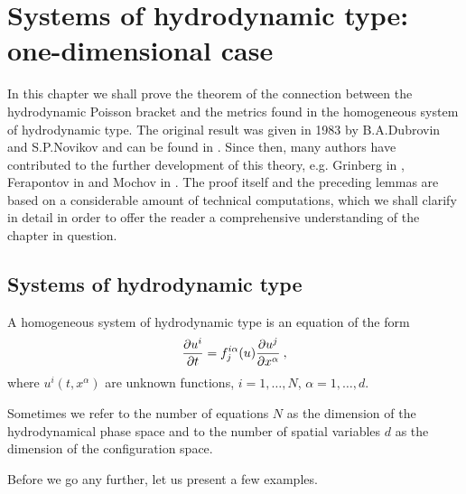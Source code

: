 \chapter{Systems of hydrodynamic type: one-dimensional case}

In this chapter we shall prove the theorem of the connection between the hydrodynamic Poisson bracket and the metrics found in the homogeneous system of hydrodynamic type. The original result was given in 1983 by B.A.Dubrovin and S.P.Novikov and can be found in \cite{Dubrovin-Novikov}. Since then, many authors have contributed to the further development of this theory, e.g. Grinberg in \cite{Grinberg}, Ferapontov in \cite{Ferapontov} and Mochov in \cite{Mochov}.
The proof itself and the preceding lemmas are based on a considerable amount of technical computations, which we shall clarify in detail in order to offer the reader a comprehensive understanding of the chapter in question.


\section{Systems of hydrodynamic type}

\begin{definition}
    A homogeneous system of hydrodynamic type is an equation of the form
    \begin{align}
        \label{eq:h-system}
        \frac{\partial u^i}{\partial t} = f_j^{i \alpha} (u) \frac{\partial u^j}{\partial x^\alpha} \:,
    \end{align}
    where $u^i(t,x^\alpha)$ are unknown functions, $i = 1, \dots , N$, $\alpha = 1, \dots , d$.
\end{definition}

Sometimes we refer to the number of equations $N$ as the dimension of the hydrodynamical phase space and to the number of spatial variables $d$ as the dimension of the configuration space.

Before we go any further, let us present a few examples.

